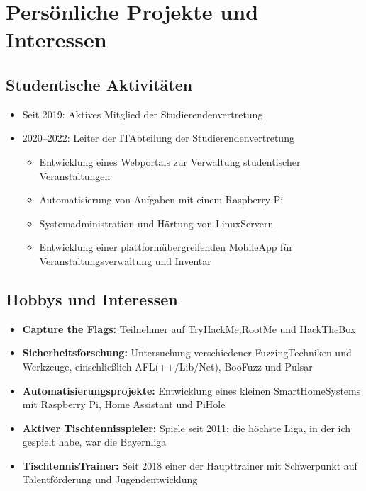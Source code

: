 \section{Persönliche Projekte und Interessen}\label{sec:eigenschaften}
\subsection{Studentische Aktivitäten}\label{subsec:student-activities}
\begin{itemize}
    \item Seit 2019: Aktives Mitglied der Studierendenvertretung
    \item 2020--2022: Leiter der IT\-Abteilung der Studierendenvertretung
    \begin{itemize}
        \item Entwicklung eines Webportals zur Verwaltung studentischer Veranstaltungen
        \item Automatisierung von Aufgaben mit einem Raspberry Pi
        \item Systemadministration und Härtung von Linux\-Servern
        \item Entwicklung einer plattformübergreifenden Mobile\-App für Veranstaltungsverwaltung und Inventar
    \end{itemize}
\end{itemize}
\subsection{Hobbys und Interessen}\label{subsec:hobbies-and-interests}
\begin{itemize}
    \item \textbf{Capture the Flags:} Teilnehmer auf TryHackMe,\newline RootMe und HackTheBox
    \item \textbf{Sicherheitsforschung:} Untersuchung verschiedener Fuzzing\-Techniken und Werkzeuge, einschließlich AFL(++/Lib/Net), BooFuzz und Pulsar
    \item \textbf{Automatisierungsprojekte:} Entwicklung eines kleinen Smart\-Home\-Systems mit Raspberry Pi, Home Assistant und Pi\-Hole
    \item \textbf{Aktiver Tischtennisspieler:} Spiele seit 2011; die höchste Liga, in der ich gespielt habe, war die Bayernliga
    \item \textbf{Tischtennis\-Trainer:} Seit 2018 einer der Haupttrainer mit Schwerpunkt auf Talentförderung und Jugendentwicklung
\end{itemize}
